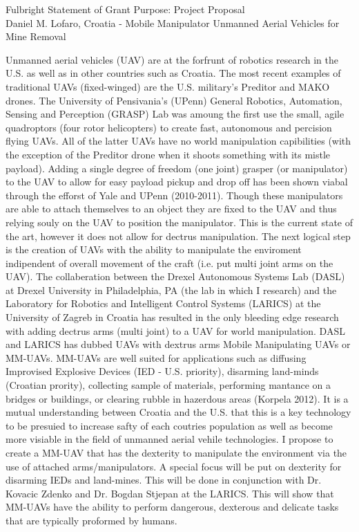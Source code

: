 \documentclass[12pt]{article}
\begin{document}
\begin{center}
Fulbright Statement of Grant Purpose: Project Proposal\\
Daniel M. Lofaro, Croatia - 
Mobile Manipulator Unmanned Aerial Vehicles for Mine Removal\\

\end{center}

Unmanned aerial vehicles (UAV) are at the forfrunt of robotics research in the U.S. as well as in other countries such as Croatia.  
The most recent examples of traditional UAVs (fixed-winged) are the U.S. military's Preditor and MAKO drones.  
The University of Pensivania's (UPenn) General Robotics, Automation, Sensing and Perception (GRASP) Lab was amoung the first use the small, agile quadroptors (four rotor helicopters) to create fast, autonomous and percision flying UAVs.  
All of the latter UAVs have no world manipulation capibilities (with the exception  of the Preditor drone when it shoots something with its mistle payload).  
Adding a single degree of freedom (one joint) grasper (or manipulator) to the UAV to allow for easy payload pickup and drop off has been shown viabal through the efforst of Yale and UPenn (2010-2011). 
Though these manipulators are able to attach themselves to an object they are fixed to the UAV and thus relying souly on the UAV to position the manipulator.  
This is the current state of the art, however it does not allow for dectrus manipulation.  
The next logical step is the creation of UAVs with the ability to manipulate the enviroment indipendent of overall movement of the craft (i.e. put multi joint arms on the UAV).  
The collaberation between the Drexel Autonomous Systems Lab (DASL) at Drexel University in Philadelphia, PA (the lab in which I research) and the Laboratory for Robotics and Intelligent Control Systems (LARICS) at the University of Zagreb in Croatia has resulted in the only bleeding edge research with adding dectrus arms (multi joint) to a UAV for world manipulation.  DASL and LARICS has dubbed UAVs with dextrus arms Mobile Manipulating UAVs or MM-UAVs. 
MM-UAVs are well suited for applications such as diffusing Improvised Explosive Devices (IED - U.S. priority), disarming land-minds (Croatian prority), collecting sample of materials, performing mantance on a bridges or buildings, or clearing rubble in hazerdous areas (Korpela 2012).  
It is a mutual understanding between Croatia and the U.S. that this is a key technology to be presuied to increase safty of each coutries population as well as become more visiable in the field of unmanned aerial vehile technologies.
I propose to create a MM-UAV that has the dexterity to manipulate the environment via the use of attached  arms/manipulators. 
A special focus will be put on dexterity for disarming IEDs and land-mines.  
This will be done in conjunction with Dr. Kovacic Zdenko and Dr. Bogdan Stjepan at the LARICS.  
This will show that MM-UAVs have the ability to perform dangerous, dexterous and delicate tasks that are typically proformed by humans.
\end{document}
